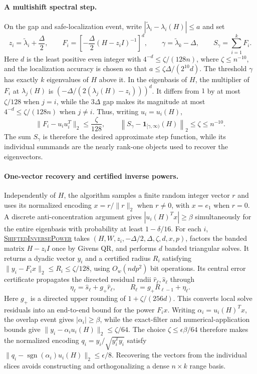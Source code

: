 \documentclass[11pt]{article}
\newcommand{\ShiftedInversePower}{%
  \textnormal{\textsc{Shifted\hspace{0pt}Inverse\hspace{0pt}Power}}}
\begin{document}
\paragraph{A multishift spectral step.}
On the gap and safe-localization event, write
$|\widetilde\lambda_i-\lambda_i(H)|\leq a$ and set
\[
 z_i=\widetilde\lambda_i+\frac{\Delta}{2},
 \qquad
 F_i=\left[-\frac{\Delta}{2}(H-z_iI)^{-1}\right]^d,
 \qquad
 \gamma=\widetilde\lambda_k-\Delta,
 \qquad
 S_\gamma=\sum_{i=1}^kF_i.
\]
Here $d$ is the least positive even integer with
$4^{-d}\leq\zeta/(128n)$, where $\zeta\leq n^{-10}$, and the localization
accuracy is chosen so that $a\leq\zeta\Delta/(2^{10}d)$.  The threshold
$\gamma$ has exactly $k$ eigenvalues of $H$ above it.  In the eigenbasis of
$H$, the multiplier of $F_i$ at $\lambda_j(H)$ is
$(-\Delta/(2(\lambda_j(H)-z_i)))^d$.  It differs from $1$ by at most
$\zeta/128$ when $j=i$, while the $3\Delta$ gap makes its magnitude at most
$4^{-d}\leq\zeta/(128n)$ when $j\ne i$.  Thus, writing
$u_i=u_i(H)$,
\[
 \lVert F_i-u_iu_i^T\rVert_2\leq\frac{\zeta}{128},
 \qquad
 \left\lVert S_\gamma-
 \mathbf 1_{[\gamma,\infty)}(H)\right\rVert_2
 \leq\zeta\leq n^{-10}.
\]
The sum $S_\gamma$ is therefore the desired approximate step function, while
its individual summands are the nearly rank-one objects used to recover the
eigenvectors.

\paragraph{One-vector recovery and certified inverse powers.}
Independently of $H$, the algorithm samples a finite random integer vector
$r$ and uses its normalized encoding $x=r/\lVert r\rVert_2$ when $r\ne0$,
with $x=e_1$ when $r=0$.  A discrete anti-concentration argument gives
$|u_i(H)^Tx|\geq\beta$ simultaneously for the entire eigenbasis with
probability at least $1-\delta/16$.  For each $i$,
\hyperref[alg:inverse-power]{\ShiftedInversePower} takes
$(H,W,z_i,-\Delta/2,\Delta,\zeta,d,x,p)$,
factors the banded matrix $H-z_iI$ once by Givens QR, and performs $d$
banded triangular solves.  It returns a dyadic vector $y_i$ and a certified
radius $R_i$ satisfying
$\lVert y_i-F_ix\rVert_2\leq R_i\leq\zeta/128$, using
$O_w(ndp^2)$ bit operations.  Its central error
certificate propagates the directed residual radii
$\widehat r_\ell,\widehat s_\ell$ through
\[
 \eta_\ell=\widehat s_\ell+g_+\widehat r_\ell,
 \qquad
 R_\ell=g_+R_{\ell-1}+\eta_\ell.
\]
Here $g_+$ is a directed upper rounding of
$1+\zeta/(256d)$.
This converts local solve residuals into an end-to-end bound for the power
$F_ix$.  Writing $\alpha_i=u_i(H)^Tx$, the overlap event gives
$|\alpha_i|\geq\beta$, while the exact-filter and numerical-application
bounds give
$\lVert y_i-\alpha_i u_i(H)\rVert_2\leq\zeta/64$.  The choice
$\zeta\leq\epsilon\beta/64$ therefore makes the normalized encoding
$q_i=y_i/\sqrt{y_i^Ty_i}$ satisfy
$\lVert q_i-\operatorname{sgn}(\alpha_i)u_i(H)\rVert_2\leq\epsilon/8$.
Recovering the vectors from the individual slices avoids constructing and
orthogonalizing a dense $n\times k$ range basis.
\end{document}
